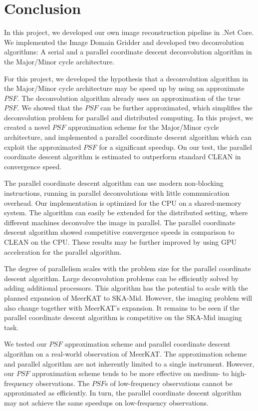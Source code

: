 \section{Conclusion}
In this project, we developed our own image reconstruction pipeline in .Net Core. We implemented the Image Domain Gridder\cite{veenboer2017image} and developed two deconvolution algorithms: A serial and a parallel coordinate descent deconvolution algorithm in the Major/Minor cycle architecture. 

For this project, we developed the hypothesis that a deconvolution algorithm in the Major/Minor cycle architecture may be speed up by using an approximate $PSF$. The deconvolution algorithm already uses an approximation of the true $PSF$. We showed that the $PSF$ can be further approximated, which simplifies the deconvolution problem for parallel and distributed computing. In this project, we created a novel $PSF$ approximation scheme for the Major/Minor cycle architecture, and implemented a parallel coordinate descent algorithm which can exploit the approximated  $PSF$ for a significant speedup. On our test, the parallel coordinate descent algorithm is estimated to outperform standard CLEAN in convergence speed.

The parallel coordinate descent algorithm can use modern non-blocking instructions, running in parallel deconvolutions with little communication overhead. Our implementation is optimized for the CPU on a shared-memory system. The algorithm can easily be extended for the distributed setting, where different machines deconvolve the image in parallel. The parallel coordinate descent algorithm showed competitive convergence speeds in comparison to CLEAN on the CPU. These results may be further improved by using GPU acceleration for the parallel algorithm.

The degree of parallelism scales with the problem size for the parallel coordinate descent algorithm. Large deconvolution problems can be efficiently solved by adding additional processors. This algorithm has the potential to scale with the planned expansion of MeerKAT to SKA-Mid. However, the imaging problem will also change together with MeerKAT's expansion. It remains to be seen if the parallel coordinate descent algorithm is competitive on the SKA-Mid imaging task.

We tested our $PSF$ approximation scheme and parallel coordinate descent algorithm on a real-world observation of MeerKAT. The approximation scheme and parallel algorithm are not inherently limited to a single instrument. However, our $PSF$ approximation scheme tends to be more effective on medium- to high-frequency observations. The $PSF$s of low-frequency observations cannot be approximated as efficiently. In turn, the parallel coordinate descent algorithm may not achieve the same speedups on low-frequency observations.

